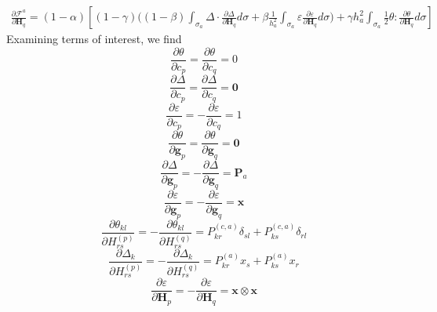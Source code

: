 \documentclass[11pt]{article} %
\begin{document}
\begin{eqnarray}
	\frac{\partial \mathcal{F}^a}{\partial \mathbf{H}_q} = (1-\alpha) \left[ (1-\gamma) \bigg( (1-\beta) \int_{\sigma_a} \Delta \cdot \frac{\partial \Delta}{\partial \mathbf{H}_q} d \sigma + \beta \frac{1}{h_a^2} \int_{\sigma_a} \varepsilon \frac{\partial \varepsilon}{\partial \mathbf{H}_q} d \sigma \bigg) + \gamma h_a^2 \int_{\sigma_a} \frac{1}{2} \theta \colon \frac{\partial \theta}{\partial \mathbf{H}_q} d \sigma \right]
\end{eqnarray}
Examining terms of interest, we find
\begin{equation}
	\frac{\partial \theta}{\partial c_p} = \frac{\partial \theta}{\partial c_q} = 0
\end{equation}
\begin{equation}
	\frac{\partial \Delta}{\partial c_p} = \frac{\partial \Delta}{\partial c_q} = \mathbf{0}
\end{equation}
\begin{equation}
	\frac{\partial \varepsilon}{\partial c_p} = - \frac{\partial \varepsilon}{\partial c_q} = 1
\end{equation}
\begin{equation}
	\frac{\partial \theta}{\partial \mathbf{g}_p} = \frac{\partial \theta}{\partial \mathbf{g}_q} = \mathbf{0}
\end{equation}
\begin{equation}
	\frac{\partial \Delta}{\partial \mathbf{g}_p} = - \frac{\partial \Delta}{\partial \mathbf{g}_q} = \mathbf{P}_a
\end{equation}
\begin{equation}
	\frac{\partial \varepsilon}{\partial \mathbf{g}_p} = - \frac{\partial \varepsilon}{\partial \mathbf{g}_q} = \mathbf{x}
\end{equation}
\begin{equation}
	\frac{\partial \theta_{kl}}{\partial H_{rs}^{(p)}} = - \frac{\partial \theta_{kl}}{\partial H_{rs}^{(q)}} = P^{(c,a)}_{kr} \delta_{sl} + P^{(c,a)}_{ks} \delta_{rl}
\end{equation}
\begin{equation}
	\frac{\partial \Delta_k}{\partial H_{rs}^{(p)}} = - \frac{\partial \Delta_k}{\partial H_{rs}^{(q)}} = P^{(a)}_{kr} x_s + P^{(a)}_{ks} x_r
\end{equation}
\begin{equation}
	\frac{\partial \varepsilon}{\partial \mathbf{H}_p} = - \frac{\partial \varepsilon}{\partial \mathbf{H}_q} = \mathbf{x} \otimes \mathbf{x}
\end{equation}
\end{document}
